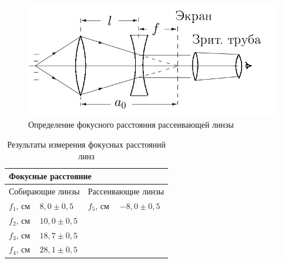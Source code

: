 \documentclass[a4paper,12pt]{article} %
\begin{document}
\begin{enumerate}
\begin{figure}[h]
	\end{figure}
 	\begin{figure}[h]
 \centering
 \includegraphics[scale=0.8]{lab_pic2.jpg}
		\caption{Определение фокусного расстояния рассеивающей линзы}
		
	\end{figure}
\end{enumerate}
\begin{table}[h]
\centering
\begin{tabular}{|llll|}

\hline
\multicolumn{4}{|l|}{Фокусные расстояние}                                                                                 \\ \hline
\multicolumn{2}{|l|}{Собирающие линзы}                                  & \multicolumn{2}{l|}{Рассеивающие линзы}         \\ \hline
\multicolumn{1}{|l|}{$f_{1}$, см} & \multicolumn{1}{l|}{$8,0 \pm 0,5$}  & \multicolumn{1}{l|}{$f_{5}$, см} & $-8,0 \pm 0,5$ \\ \hline
\multicolumn{1}{|l|}{$f_{2}$, см} & \multicolumn{1}{l|}{$10,0 \pm 0,5$} & \multicolumn{1}{l|}{}            &              \\ \hline
\multicolumn{1}{|l|}{$f_{3}$, см} & \multicolumn{1}{l|}{$18,7 \pm 0,5$} & \multicolumn{1}{l|}{}            &              \\ \hline
\multicolumn{1}{|l|}{$f_{4}$, см} & \multicolumn{1}{l|}{$28,1 \pm 0,5$} & \multicolumn{1}{l|}{}            &              \\ \hline
\end{tabular}
\caption{Результаты измерения фокусных расстояний линз}
\end{table}
\newpage
\end{document}

